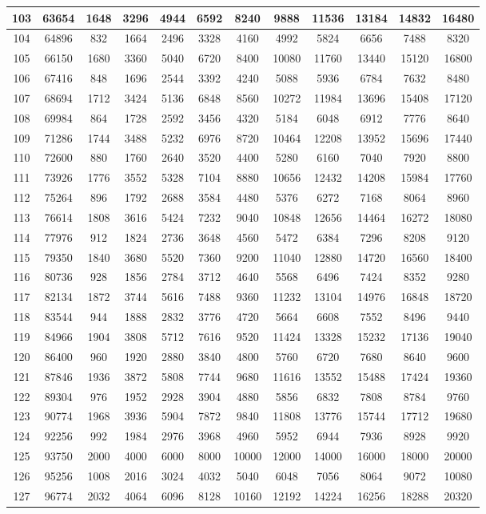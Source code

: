 \documentclass[oneside,english]{book}
\providecommand{\tabularnewline}{\\}
\begin{document}
\begin{center}
\begin{longtable}{|c|c|c|c|c|c|c|c|c|c|c|c|}
\hline
103 & 63654 & 1648 & 3296 & 4944 & 6592 & 8240 & 9888 & 11536 & 13184 & 14832 & 16480\tabularnewline
\hline
104 & 64896 & 832 & 1664 & 2496 & 3328 & 4160 & 4992 & 5824 & 6656 & 7488 & 8320\tabularnewline
\hline
105 & 66150 & 1680 & 3360 & 5040 & 6720 & 8400 & 10080 & 11760 & 13440 & 15120 & 16800\tabularnewline
\hline
106 & 67416 & 848 & 1696 & 2544 & 3392 & 4240 & 5088 & 5936 & 6784 & 7632 & 8480\tabularnewline
\hline
107 & 68694 & 1712 & 3424 & 5136 & 6848 & 8560 & 10272 & 11984 & 13696 & 15408 & 17120\tabularnewline
\hline
108 & 69984 & 864 & 1728 & 2592 & 3456 & 4320 & 5184 & 6048 & 6912 & 7776 & 8640\tabularnewline
\hline
109 & 71286 & 1744 & 3488 & 5232 & 6976 & 8720 & 10464 & 12208 & 13952 & 15696 & 17440\tabularnewline
\hline
110 & 72600 & 880 & 1760 & 2640 & 3520 & 4400 & 5280 & 6160 & 7040 & 7920 & 8800\tabularnewline
\hline
111 & 73926 & 1776 & 3552 & 5328 & 7104 & 8880 & 10656 & 12432 & 14208 & 15984 & 17760\tabularnewline
\hline
112 & 75264 & 896 & 1792 & 2688 & 3584 & 4480 & 5376 & 6272 & 7168 & 8064 & 8960\tabularnewline
\hline
113 & 76614 & 1808 & 3616 & 5424 & 7232 & 9040 & 10848 & 12656 & 14464 & 16272 & 18080\tabularnewline
\hline
114 & 77976 & 912 & 1824 & 2736 & 3648 & 4560 & 5472 & 6384 & 7296 & 8208 & 9120\tabularnewline
\hline
115 & 79350 & 1840 & 3680 & 5520 & 7360 & 9200 & 11040 & 12880 & 14720 & 16560 & 18400\tabularnewline
\hline
116 & 80736 & 928 & 1856 & 2784 & 3712 & 4640 & 5568 & 6496 & 7424 & 8352 & 9280\tabularnewline
\hline
117 & 82134 & 1872 & 3744 & 5616 & 7488 & 9360 & 11232 & 13104 & 14976 & 16848 & 18720\tabularnewline
\hline
118 & 83544 & 944 & 1888 & 2832 & 3776 & 4720 & 5664 & 6608 & 7552 & 8496 & 9440\tabularnewline
\hline
119 & 84966 & 1904 & 3808 & 5712 & 7616 & 9520 & 11424 & 13328 & 15232 & 17136 & 19040\tabularnewline
\hline
120 & 86400 & 960 & 1920 & 2880 & 3840 & 4800 & 5760 & 6720 & 7680 & 8640 & 9600\tabularnewline
\hline
121 & 87846 & 1936 & 3872 & 5808 & 7744 & 9680 & 11616 & 13552 & 15488 & 17424 & 19360\tabularnewline
\hline
122 & 89304 & 976 & 1952 & 2928 & 3904 & 4880 & 5856 & 6832 & 7808 & 8784 & 9760\tabularnewline
\hline
123 & 90774 & 1968 & 3936 & 5904 & 7872 & 9840 & 11808 & 13776 & 15744 & 17712 & 19680\tabularnewline
\hline
124 & 92256 & 992 & 1984 & 2976 & 3968 & 4960 & 5952 & 6944 & 7936 & 8928 & 9920\tabularnewline
\hline
125 & 93750 & 2000 & 4000 & 6000 & 8000 & 10000 & 12000 & 14000 & 16000 & 18000 & 20000\tabularnewline
\hline
126 & 95256 & 1008 & 2016 & 3024 & 4032 & 5040 & 6048 & 7056 & 8064 & 9072 & 10080\tabularnewline
\hline
127 & 96774 & 2032 & 4064 & 6096 & 8128 & 10160 & 12192 & 14224 & 16256 & 18288 & 20320\tabularnewline

\end{longtable}
\end{center}
\end{document}
